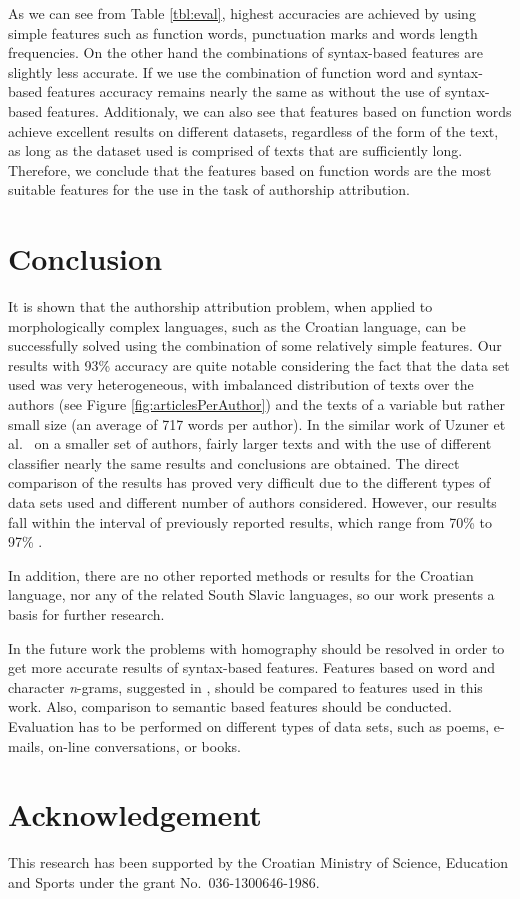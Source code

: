 \documentclass{llncs}
\begin{document}
As we can see from Table \ref{tbl:eval}, highest accuracies are achieved by
using simple features such as function words, punctuation marks and words length
frequencies. On the other hand the combinations of syntax-based features are
slightly less accurate. If we use the combination of function word and
syntax-based features accuracy remains nearly the same as without the use of syntax-based
features. Additionaly, we can also see that features based on function
words achieve excellent results on different datasets, regardless of the form of
the text, as long as the dataset used is comprised of texts that are
sufficiently long. Therefore, we conclude that the features based on function
words are the most suitable features for the use in the task of authorship
attribution.

\section{Conclusion}
It is shown that the authorship attribution problem, when applied to
morphologically complex languages, such as the Croatian language, can be
successfully solved using the combination of some relatively simple features. Our
results with 93\% accuracy are quite notable considering the fact that the data
set used was very heterogeneous, with imbalanced distribution of texts over the
authors (see Figure \ref{fig:articlesPerAuthor}) and the texts of a variable but
rather small size (an average of 717 words per author). In the similar work of
Uzuner et al.\ \cite{uzuner2005comparative} on a smaller set of authors, fairly
larger texts and with the use of different classifier nearly the same results and
conclusions are obtained. The direct comparison of the results has proved very
difficult due to the different types of data sets used  and different number of
authors considered. However, our results fall within the interval of previously
reported results, which range from 70\% to 97\%
\cite{coyotl2006authorship,keselj2003n,luyckx2005shallow,stamatatos2001computer,uzuner2005comparative}.

In addition, there are no other reported methods or results for the Croatian
language, nor any of the related South Slavic languages, so our work presents a
basis for further research.

In the future work the problems with homography should be resolved in order to
get more accurate results of syntax-based features. Features based on word and
character \emph{n}-grams, suggested in
\cite{coyotl2006authorship,keselj2003n,peng2003language}, should be compared to
features used in this work. Also, comparison to semantic based features
should be conducted. Evaluation has to be performed on different types
of data sets, such as poems, e-mails, on-line conversations, or books.


\section*{Acknowledgement}
This research has been supported by the Croatian Ministry of Science, Education
and Sports under the grant No.~036-1300646-1986.



\end{document}
